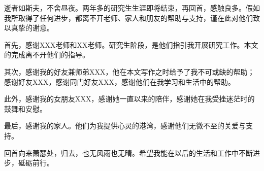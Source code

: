 \cleardoublepage
{}

逝者如斯夫，不舍昼夜。两年多的研究生生涯即将结束，再回首，感触良多。假如我所取得了任何进步，都离不开老师、家人和朋友的帮助与支持，谨在此对他们致以真挚的谢意。

首先，感谢XXX老师和XX老师。研究生阶段，是他们指引我开展研究工作。本文的完成离不开他们的指导。

其次，感谢我的好友兼师弟XXX，他在本文写作之时给予了我不可或缺的帮助；感谢好友XXX，感谢同门好友XXX，感谢他们在我学习和生活中的帮助。

此外，感谢我的女朋友XXX，感谢她一直以来的陪伴，感谢她在我受挫迷茫时的鼓舞和安慰。

最后，感谢我的家人。他们为我提供心灵的港湾，感谢他们无微不至的关爱与支持。

回首向来萧瑟处，归去，也无风雨也无晴。希望我能在以后的生活和工作中不断进步，砥砺前行。